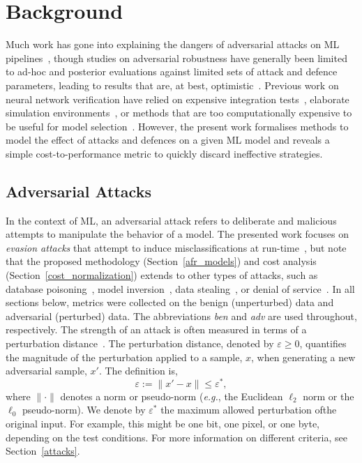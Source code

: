 \section{Background}

Much work has gone into explaining the dangers of adversarial attacks on ML pipelines~\cite{carlini_towards_2017,croce_reliable_2020,pixelattack,fgm,biggio_evasion_2013}, though studies on adversarial robustness have generally been limited to ad-hoc and posterior evaluations against limited sets of attack and defence parameters, leading to results that are, at best, optimistic~\cite{meyers,ma2020imbalanced}. Previous work on neural network verification have relied on expensive integration tests~\cite{vehicle_testing_review}, elaborate simulation environments~\cite{vehicle_formal}, or methods that are too computationally expensive to be useful for model selection~\cite{formal_adversarial}.
However, the present work formalises methods to model the effect of attacks and defences on a given ML model and reveals a simple cost-to-performance metric to quickly discard ineffective strategies.


\subsection{Adversarial Attacks}

In the context of ML, an adversarial attack refers to deliberate and malicious attempts to manipulate the behavior of a model. The presented work focuses on \textit{evasion attacks} that attempt to induce misclassifications at run-time~\cite{carlini_towards_2017,biggio_evasion_2013}, but note that the proposed methodology (Section~\ref{afr_models}) and cost analysis (Section~\ref{cost_normalization}) extends to other types of attacks, such as database poisoning~\cite{biggio_poisoning_2013,saha2020hidden}, model inversion~\cite{choquette2021label,li2021membership}, data stealing~\cite{orekondy2019knockoff}, or denial of service~\cite{santos2021universal}. In all sections below, metrics were collected on the benign (unperturbed) data and adversarial (perturbed) data. The abbreviations \textit{ben} and \textit{adv} are used throughout, respectively.
The strength of an attack is often measured in terms of a perturbation distance~\cite{croce_reliable_2020,chakraborty_adversarial_2018,pixelattack}. The perturbation distance, denoted by $\varepsilon\geq0$, quantifies the magnitude of the perturbation applied to a sample, $x$, when generating a new adversarial sample, $x'$. The definition is,
\begin{equation}
    \varepsilon := \| x' - x \| \leq \varepsilon^*,
    \label{eq:perturbation_distance}
\end{equation}
where $\| \cdot \|$ denotes a norm or pseudo-norm (\textit{e.g.}, the Euclidean $\ell_2$ norm or the $\ell_0$ pseudo-norm). We denote by $\varepsilon^*$ the maximum allowed perturbation ofthe original input. For example, this might be one bit, one pixel, or one byte, depending on the test conditions. For more information on different criteria, see Section~\ref{attacks}.


